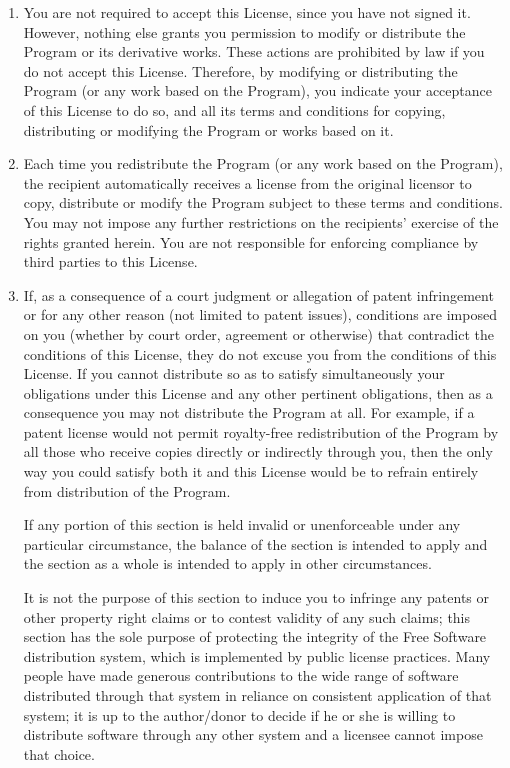 \documentclass[11pt, letterpaper]{book}
\begin{document}
\begin{enumerate}
\item
You are not required to accept this License, since you have not
signed it. However, nothing else grants you permission to modify or
distribute the Program or its derivative works. These actions are
prohibited by law if you do not accept this License. Therefore, by
modifying or distributing the Program (or any work based on the
Program), you indicate your acceptance of this License to do so, and
all its terms and conditions for copying, distributing or modifying
the Program or works based on it.

\item
Each time you redistribute the Program (or any work based on the
Program), the recipient automatically receives a license from the
original licensor to copy, distribute or modify the Program subject to
these terms and conditions. You may not impose any further
restrictions on the recipients' exercise of the rights granted herein.
You are not responsible for enforcing compliance by third parties to
this License.

\item
If, as a consequence of a court judgment or allegation of patent
infringement or for any other reason (not limited to patent issues),
conditions are imposed on you (whether by court order, agreement or
otherwise) that contradict the conditions of this License, they do not
excuse you from the conditions of this License. If you cannot
distribute so as to satisfy simultaneously your obligations under this
License and any other pertinent obligations, then as a consequence you
may not distribute the Program at all. For example, if a patent
license would not permit royalty-free redistribution of the Program by
all those who receive copies directly or indirectly through you, then
the only way you could satisfy both it and this License would be to
refrain entirely from distribution of the Program.

If any portion of this section is held invalid or unenforceable under
any particular circumstance, the balance of the section is intended to
apply and the section as a whole is intended to apply in other
circumstances.

It is not the purpose of this section to induce you to infringe any
patents or other property right claims or to contest validity of any
such claims; this section has the sole purpose of protecting the
integrity of the Free Software distribution system, which is
implemented by public license practices. Many people have made
generous contributions to the wide range of software distributed
through that system in reliance on consistent application of that
system; it is up to the author/donor to decide if he or she is willing
to distribute software through any other system and a licensee cannot
impose that choice.


\end{enumerate}
\end{document}
